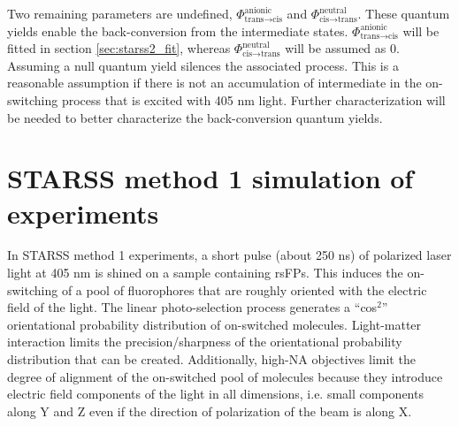 \documentclass{article}
\begin{document}
Two remaining parameters are undefined, $\Phi^{\text{anionic}}_{\text{trans} \rightarrow \text{cis}}$ and $\Phi^{\text{neutral}}_{\text{cis} \rightarrow \text{trans}}$. These quantum yields enable the back-conversion from the intermediate states. $\Phi^{\text{anionic}}_{\text{trans} \rightarrow \text{cis}}$ will be fitted in section \ref{sec:starss2_fit}, whereas $\Phi^{\text{neutral}}_{\text{cis} \rightarrow \text{trans}}$ will be assumed as 0. Assuming a null quantum yield silences the associated process. This is a reasonable assumption if there is not an accumulation of intermediate in the on-switching process that is excited with 405 nm light. Further characterization will be needed to better characterize the back-conversion quantum yields.


\clearpage
\section{STARSS method 1 simulation of experiments}\label{sec:starss_modality1}
In STARSS method 1 experiments, a short pulse (about 250 ns) of polarized laser light at 405 nm is shined on a sample containing rsFPs. This induces the on-switching of a pool of fluorophores that are roughly oriented with the electric field of the light. The linear photo-selection process generates a ``cos$^2$'' orientational probability distribution of on-switched molecules. Light-matter interaction limits the precision/sharpness of the orientational probability distribution that can be created. Additionally, high-NA objectives limit the degree of alignment of the on-switched pool of molecules because they introduce electric field components of the light in all dimensions, i.e. small components along Y and Z even if the direction of polarization of the beam is along X.
\end{document}
